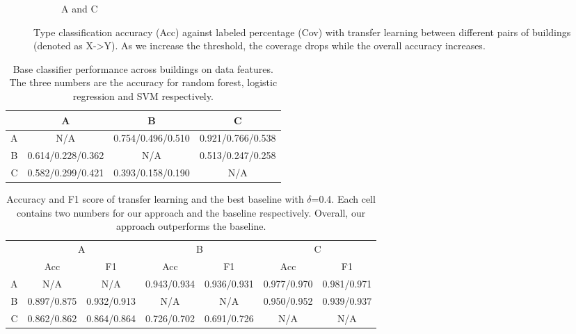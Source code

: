\begin{figure}[ht!]
\begin{subfigure}{0.32\textwidth}
                \caption{A and C}
  \end{subfigure}
\caption{Type classification accuracy (Acc) against labeled percentage (Cov) with transfer learning between different pairs of buildings (denoted as X->Y). As we increase the threshold, the coverage drops while the overall accuracy increases. }
\label{fig:tl_acc}
\end{figure}


\begin{table}[]
\centering
\begin{tabular}{r|c|c|c}
\hline
 & A     & B     & C     \\ \hline
A & N/A   & 0.754/0.496/0.510 & 0.921/0.766/0.538 \\ \hline
B & 0.614/0.228/0.362 & N/A   & 0.513/0.247/0.258 \\ \hline
C & 0.582/0.299/0.421 & 0.393/0.158/0.190 & N/A   \\ \hline
\end{tabular}
\caption{Base classifier performance across buildings on data features. The three numbers are the accuracy for random forest, logistic regression and SVM respectively.}
\label{acc_base}
\end{table}

\begin{table}[]
\centering
\begin{tabular}{r|c|c|c|c|c|c}
\hline
\multirow{2}{*}{} & \multicolumn{2}{c|}{A} & \multicolumn{2}{c|}{B} & \multicolumn{2}{c}{C} \\ \cline{2-7} 
                  & Acc        & F1        & Acc        & F1        & Acc        & F1        \\ \hline
A                 & N/A      & N/A     & 0.943/0.934      & 0.936/0.931     & 0.977/0.970      & 0.981/0.971     \\ \hline
B                 & 0.897/0.875     & 0.932/0.913     & N/A      & N/A     & 0.950/0.952      & 0.939/0.937     \\ \hline
C                 & 0.862/0.862     & 0.864/0.864     & 0.726/0.702      & 0.691/0.726     & N/A     & N/A     \\ \hline
\end{tabular}
\caption{Accuracy and F1 score of transfer learning and the best baseline with $\delta$=0.4. Each cell contains two numbers for our approach and the baseline respectively. Overall, our approach outperforms the baseline.}
\label{table:f1}
\end{table}


